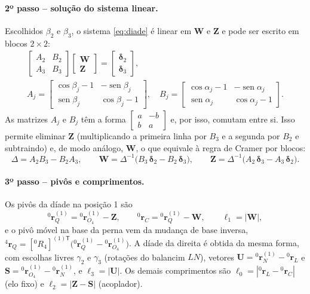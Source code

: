 \documentclass[12pt,a4paper,twoside]{article}
\DeclareMathOperator{\sen}{sen}
\newcommand{\rv}[2]{{}^{#1}\mathbf{r}_{#2}}          %
\newcommand{\Rm}[2]{[{}^{#1}R_{#2}]}                 %
\numberwithin{equation}{section}
\begin{document}
\paragraph{2º passo -- solução do sistema linear.} Escolhidos $\beta_2$ e $\beta_3$, o sistema
\eqref{eq:diade} é linear em $\mathbf W$ e $\mathbf Z$ e pode ser escrito em blocos $2\times2$:
\begin{gather}
  \begin{bmatrix} A_2 & B_2 \\ A_3 & B_3 \end{bmatrix}
  \begin{bmatrix} \mathbf W \\ \mathbf Z \end{bmatrix}
  = \begin{bmatrix} \boldsymbol\delta_2 \\ \boldsymbol\delta_3 \end{bmatrix} ,
  \\
  A_j = \begin{bmatrix} \cos\beta_j - 1 & -\sen\beta_j \\ \sen\beta_j & \cos\beta_j - 1 \end{bmatrix},\quad
  B_j = \begin{bmatrix} \cos\alpha_j - 1 & -\sen\alpha_j \\ \sen\alpha_j & \cos\alpha_j - 1 \end{bmatrix}.
\end{gather}
As matrizes $A_j$ e $B_j$ têm a forma $\left[\begin{smallmatrix} a & -b \\ b & a \end{smallmatrix}\right]$ e, por isso,
comutam entre si. Isso permite eliminar $\mathbf Z$ (multiplicando a primeira linha por $B_3$ e a
segunda por $B_2$ e subtraindo) e, de modo análogo, $\mathbf W$, o que equivale à regra de Cramer
por blocos:
\begin{equation}
  \Delta = A_2 B_3 - B_2 A_3,
  \qquad
  \mathbf W = \Delta^{-1}\big(B_3\,\boldsymbol\delta_2 - B_2\,\boldsymbol\delta_3\big),
  \qquad
  \mathbf Z = \Delta^{-1}\big(A_2\,\boldsymbol\delta_3 - A_3\,\boldsymbol\delta_2\big).
  \label{eq:cramer}
\end{equation}

\paragraph{3º passo -- pivôs e comprimentos.} Os pivôs da díade na posição 1 são
\begin{equation}
  \rv{0}{Q}^{(1)} = \rv{0}{O_4}^{(1)} - \mathbf Z, \qquad \rv{0}{C} = \rv{0}{Q}^{(1)} - \mathbf W,
  \qquad \ell_1 = |\mathbf W| ,
\end{equation}
e o pivô móvel na base da perna vem da mudança de base inversa,
$\rv{4}{Q} = \Rm{0}{4}^{(1)\mathsf T}\big(\rv{0}{Q}^{(1)} - \rv{0}{O_4}^{(1)}\big)$.
A díade da direita é obtida da mesma forma, com escolhas livres $\gamma_2$ e $\gamma_3$
(rotações do balancim $LN$), vetores $\mathbf U = \rv{0}{N}^{(1)} - \rv{0}{L}$ e
$\mathbf S = \rv{0}{O_4}^{(1)} - \rv{0}{N}^{(1)}$, e $\ell_3 = |\mathbf U|$. Os demais comprimentos são
$\ell_0 = |\rv{0}{L} - \rv{0}{C}|$ (elo fixo) e $\ell_2 = |\mathbf Z - \mathbf S|$ (acoplador).
\end{document}
